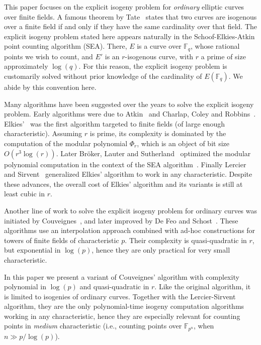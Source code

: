\documentclass{lms}
\newcommand{\F}{\mathbb{F}}
\begin{document}
This paper focuses on the explicit isogeny problem for \emph{ordinary}
elliptic curves over finite fields. A famous theorem by Tate~\cite{tate1966endomorphisms} states
that two curves are isogenous over a finite field if and only if they
have the same cardinality over that field. The explicit isogeny
problem stated here appears naturally in the Schoof-Elkies-Atkin point
counting algorithm (SEA). There, $E$ is a curve over $\F_q$, whose rational points
we wish to count, and $E'$ is an $r$-isogenous curve, with $r$
a prime of size approximately $\log(q)$. For this reason, the explicit
isogeny problem is customarily solved without prior knowledge of the
cardinality of $E(\F_q)$. We abide by this convention here.

Many algorithms
have been suggested over the years to solve the explicit isogeny
problem. Early algorithms were due to Atkin~\cite{atkin91} and
Charlap, Coley and
Robbins~\cite{charlap1991enumeration}. Elkies'~\cite{elkies98,Bostan}
was the first algorithm targeted to finite fields (of large enough
characteristic). Assuming $r$ is prime, its complexity is dominated by
the computation of the modular polynomial $\Phi_r$, which is an object
of bit size $O(r^3\log(r))$. Later Bröker, Lauter and
Sutherland~\cite{sutherland10:modpol} optimized the modular polynomial
computation in the context of the SEA
algorithm~\cite{sutherland2013evaluation}. Finally Lercier and Sirvent~\cite{lercier+sirvent08,1602.00244}
generalized Elkies' algorithm to work in any characteristic. Despite
these advances, the overall cost of Elkies' algorithm and its
variants is still at least cubic in $r$.

Another line of work to solve the explicit isogeny problem for ordinary curves was
initiated by Couveignes~\cite{couveignes94,couveignes96,couveignes00},
and later improved by De Feo and Schost~\cite{df10,df+schost12}. These
algorithms use an interpolation approach combined with ad-hoc
constructions for towers of finite fields of characteristic $p$. Their
complexity is quasi-quadratic in $r$, but exponential in $\log(p)$,
hence they are only practical for very small characteristic.

In this paper we present a variant of Couveignes' algorithm with
complexity polynomial in $\log(p)$ and quasi-quadratic in $r$. Like the original 
algorithm, it is limited to  isogenies of ordinary curves. Together
with the Lercier-Sirvent algorithm, they are the only polynomial-time
isogeny computation algorithms working in any characteristic, hence
they are especially relevant for counting points in \emph{medium}
characteristic (i.e., counting points over $\F_{p^n}$, when
$n\gg p/\log (p)$).
\end{document}
